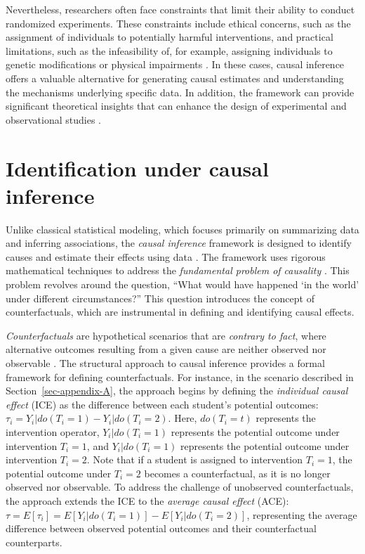 \documentclass[
  authoryear,
  review,
  1p]{elsarticle}
\begin{document}
Nevertheless, researchers often face constraints that limit their
ability to conduct randomized experiments. These constraints include
ethical concerns, such as the assignment of individuals to potentially
harmful interventions, and practical limitations, such as the
infeasibility of, for example, assigning individuals to genetic
modifications or physical impairments \citep{Neal_2020}. In these cases,
causal inference offers a valuable alternative for generating causal
estimates and understanding the mechanisms underlying specific data. In
addition, the framework can provide significant theoretical insights
that can enhance the design of experimental and observational studies
\citep{McElreath_2020}.

\section{Identification under causal inference}\label{sec-appendix-B}

Unlike classical statistical modeling, which focuses primarily on
summarizing data and inferring associations, the \emph{causal inference}
framework is designed to identify causes and estimate their effects
using data \citep{Shaughnessy_et_al_2010, Neal_2020}. The framework uses
rigorous mathematical techniques to address the \emph{fundamental
problem of causality}
\citep{Pearl_2009, Pearl_et_al_2016, Morgan_et_al_2014}. This problem
revolves around the question, ``What would have happened `in the world'
under different circumstances?'' This question introduces the concept of
counterfactuals, which are instrumental in defining and identifying
causal effects.

\emph{Counterfactuals} are hypothetical scenarios that are
\emph{contrary to fact}, where alternative outcomes resulting from a
given cause are neither observed nor observable
\citep{Neal_2020, Counterfactual_2024}. The structural approach to
causal inference \citep{Pearl_2009, Pearl_et_al_2016} provides a formal
framework for defining counterfactuals. For instance, in the scenario
described in Section~\ref{sec-appendix-A}, the approach begins by
defining the \emph{individual causal effect} (ICE) as the difference
between each student's potential outcomes:
\(\tau_{i} = Y_{i}|do(T_{i}=1) - Y_{i}|do(T_{i}=2)\). Here,
\(do(T_{i}=t)\) represents the intervention operator,
\(Y_{i}|do(T_{i}=1)\) represents the potential outcome under
intervention \(T_{i}=1\), and \(Y_{i}|do(T_{i}=1)\) represents the
potential outcome under intervention \(T_{i}=2\). Note that if a student
is assigned to intervention \(T_{i}=1\), the potential outcome under
\(T_{i}=2\) becomes a counterfactual, as it is no longer observed nor
observable. To address the challenge of unobserved counterfactuals, the
approach extends the ICE to the \emph{average causal effect} (ACE):
\(\tau = E[\tau_{i}] = E[Y_{i}|do(T_{i}=1)]- E[Y_{i}|do(T_{i}=2)]\),
representing the average difference between observed potential outcomes
and their counterfactual counterparts.
\end{document}
